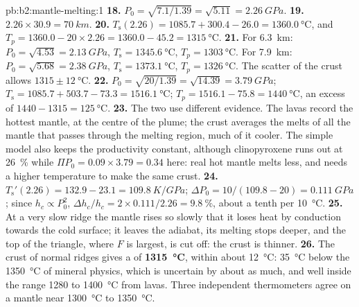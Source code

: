 \begin{solution}{pb:b2:mantle-melting:1}
\textbf{18.} $P_0 = \sqrt{7.1/1.39} = \sqrt{5.11} = \qty{2.26}{GPa}$.
\textbf{19.} $2.26\times30.9 = \qty{70}{km}$.
\textbf{20.} $T_{\mathrm s}(2.26) = 1085.7 + 300.4 - 26.0 = \qty{1360.0}{\celsius}$,
and $T_p = 1360.0 - 20\times2.26 = 1360.0 - 45.2 = \qty{1315}{\celsius}$.
\textbf{21.} For \qty{6.3}{km}: $P_0 = \sqrt{4.53} = \qty{2.13}{GPa}$, $T_{\mathrm s}
= \qty{1345.6}{\celsius}$, $T_p = \qty{1303}{\celsius}$. For \qty{7.9}{km}: $P_0 =
\sqrt{5.68} = \qty{2.38}{GPa}$, $T_{\mathrm s} = \qty{1373.1}{\celsius}$, $T_p =
\qty{1326}{\celsius}$. The scatter of the crust allows $1315 \pm
\qty{12}{\celsius}$.
\textbf{22.} $P_0 = \sqrt{20/1.39} = \sqrt{14.39} = \qty{3.79}{GPa}$; $T_{\mathrm s} =
1085.7 + 503.7 - 73.3 = \qty{1516.1}{\celsius}$; $T_p = 1516.1 - 75.8 =
\qty{1440}{\celsius}$, an excess of $1440 - 1315 = \qty{125}{\celsius}$.
\textbf{23.} The two use different evidence. The lavas record the hottest mantle,
at the centre of the plume; the crust averages the melts of all the mantle that
passes through the melting region, much of it cooler. The simple model also keeps
the productivity constant, although clinopyroxene runs out at \qty{26}{\percent}
while $\Pi P_0 = 0.09\times3.79 = 0.34$ here: real hot mantle melts less, and needs
a higher temperature to make the same crust.
\textbf{24.} $T_{\mathrm s}'(2.26) = 132.9 - 23.1 = \qty{109.8}{K/GPa}$; $\Delta P_0 =
10/(109.8 - 20) = \qty{0.111}{GPa}$; since $h_c \propto P_0^2$, $\Delta h_c/h_c =
2\times0.111/2.26 = \qty{9.8}{\percent}$, about a tenth per \qty{10}{\celsius}.
\textbf{25.} At a very slow ridge the mantle rises so slowly that it loses heat by
conduction towards the cold surface; it leaves the adiabat, its melting stops
deeper, and the top of the triangle, where $F$ is largest, is cut off: the crust is
thinner.
\textbf{26.} The crust of normal ridges gives a  of
\textbf{\qty[text-series-to-math=true]{1315}{\celsius}}, within about
\qty{12}{\celsius}: \qty{35}{\celsius} below the \qty{1350}{\celsius} of mineral
physics, which is uncertain by about as much, and well inside the range 1280 to
\qty{1400}{\celsius} from lavas. Three independent thermometers agree on a mantle
near \qty{1300}{\celsius} to \qty{1350}{\celsius}.
\end{solution}
